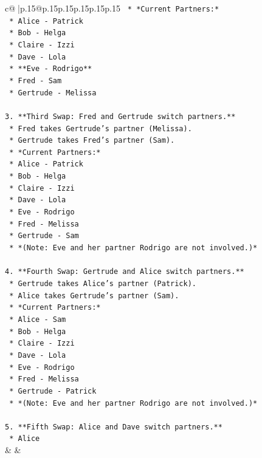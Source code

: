 \documentclass{article}
\begin{document}
{\begin{supertabular}{c@{$\;$}|p{.15\linewidth}@{}p{.15\linewidth}p{.15\linewidth}p{.15\linewidth}p{.15\linewidth}p{.15\linewidth}}
{{{\texttt{    *   *Current Partners:*} \\
\texttt{        *   Alice {-} Patrick} \\
\texttt{        *   Bob {-} Helga} \\
\texttt{        *   Claire {-} Izzi} \\
\texttt{        *   Dave {-} Lola} \\
\texttt{        *   **Eve {-} Rodrigo**} \\
\texttt{        *   Fred {-} Sam} \\
\texttt{        *   Gertrude {-} Melissa} \\
\\ 
\texttt{3.  **Third Swap: Fred and Gertrude switch partners.**} \\
\texttt{    *   Fred takes Gertrude's partner (Melissa).} \\
\texttt{    *   Gertrude takes Fred's partner (Sam).} \\
\texttt{    *   *Current Partners:*} \\
\texttt{        *   Alice {-} Patrick} \\
\texttt{        *   Bob {-} Helga} \\
\texttt{        *   Claire {-} Izzi} \\
\texttt{        *   Dave {-} Lola} \\
\texttt{        *   Eve {-} Rodrigo} \\
\texttt{        *   Fred {-} Melissa} \\
\texttt{        *   Gertrude {-} Sam} \\
\texttt{    *   *(Note: Eve and her partner Rodrigo are not involved.)*} \\
\\ 
\texttt{4.  **Fourth Swap: Gertrude and Alice switch partners.**} \\
\texttt{    *   Gertrude takes Alice's partner (Patrick).} \\
\texttt{    *   Alice takes Gertrude's partner (Sam).} \\
\texttt{    *   *Current Partners:*} \\
\texttt{        *   Alice {-} Sam} \\
\texttt{        *   Bob {-} Helga} \\
\texttt{        *   Claire {-} Izzi} \\
\texttt{        *   Dave {-} Lola} \\
\texttt{        *   Eve {-} Rodrigo} \\
\texttt{        *   Fred {-} Melissa} \\
\texttt{        *   Gertrude {-} Patrick} \\
\texttt{    *   *(Note: Eve and her partner Rodrigo are not involved.)*} \\
\\ 
\texttt{5.  **Fifth Swap: Alice and Dave switch partners.**} \\
\texttt{    *   Alice} \\
            }
        }
    }
    & & \\ \\


\end{supertabular}}
\end{document}
